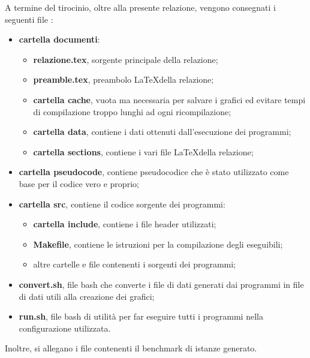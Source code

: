 \documentclass[../../relazione.tex]{subfiles}
\begin{document}
A termine del tirocinio, oltre alla presente relazione, vengono consegnati i seguenti file :
\begin{itemize}
    \item \textbf{cartella documenti}:
          \begin{itemize}
              \item \textbf{relazione.tex}, sorgente principale della relazione;
              \item \textbf{preamble.tex}, preambolo \LaTeX della relazione;
              \item \textbf{cartella cache}, vuota ma necessaria per salvare i grafici ed evitare tempi di compilazione troppo lunghi ad ogni ricompilazione;
              \item \textbf{cartella data}, contiene i dati ottenuti dall'esecuzione dei programmi;
              \item \textbf{cartella sections}, contiene i vari file \LaTeX della relazione;
          \end{itemize}
    \item \textbf{cartella pseudocode}, contiene pseudocodice che è stato utilizzato come base per il codice vero e proprio;
    \item \textbf{cartella src}, contiene il codice sorgente dei programmi:
          \begin{itemize}
              \item \textbf{cartella include}, contiene i file header utilizzati;
              \item \textbf{Makefile}, contiene le istruzioni per la compilazione degli eseguibili;
              \item altre cartelle e file contenenti i sorgenti dei programmi;
          \end{itemize}
    \item \textbf{convert.sh}, file bash che converte i file di dati generati dai programmi in file di dati utili alla creazione dei grafici;
    \item \textbf{run.sh}, file bash di utilità per far eseguire tutti i programmi nella configurazione utilizzata.
\end{itemize}

Inoltre, si allegano i file contenenti il benchmark di istanze generato.
\end{document}
